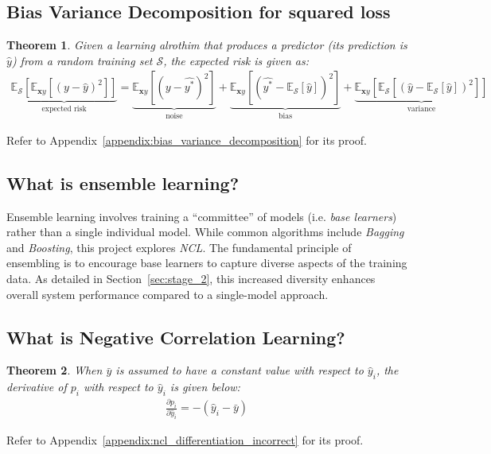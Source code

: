 \documentclass{article}
\newtheorem{theorem}{Theorem}
\begin{document}
\subsection{Bias Variance Decomposition for squared loss}
\begin{theorem}\label{theorem:bias_variance_decomposition}
    Given a learning alrothim that produces a predictor (its prediction is $\hat{y}$) from a random training set $\mathcal{S}$, the expected risk is given as: 
    \begin{align*}
        \underbrace{\mathbb{E}_{\mathcal{S}}\left[\mathbb{E}_{\mathbf{x}y}\left[(y - \hat{y})^2\right]\right]}_{\text{expected risk}} = \underbrace{\mathbb{E}_{\mathbf{x}y}\left[(y - \hat{y^*})^2\right]}_{\text{noise}} + \underbrace{\mathbb{E}_{\mathbf{x}y}\left[\left(\hat{y^*} - \mathbb{E}_{\mathcal{S}}[\hat{y}]\right)^2\right]}_{\text{bias}} + \underbrace{\mathbb{E}_{\mathbf{x}y}\left[\mathbb{E}_{\mathcal{S}}\left[(\hat{y} - \mathbb{E}_{\mathcal{S}}[\hat{y}])^2\right]\right]}_{\text{variance}}
    \end{align*}
\end{theorem}
Refer to Appendix~\ref{appendix:bias_variance_decomposition} for its proof. 


\subsection{What is ensemble learning? }
Ensemble learning involves training a ``committee'' of models (i.e. \textit{base learners}) rather than a single individual model. While common algorithms include \textit{Bagging} and \textit{Boosting}, this project explores \textit{NCL}. The fundamental principle of ensembling is to encourage base learners to capture diverse aspects of the training data. As detailed in Section~\ref{sec:stage_2}, this increased diversity enhances overall system performance compared to a single-model approach. 


\subsection{What is Negative Correlation Learning? }
\label{subsec:background_ncl}
\begin{theorem}\label{theorem:ncl_differentiation_incorrect}
    When $\bar{y}$ is assumed to have a constant value with respect to $\hat{y}_i$, the derivative of $p_i$ with respect to $\hat{y}_i$ is given below: 
    \begin{align*}
        \frac{\partial{p_i}}{\partial{\hat{y}_i}} = -(\hat{y}_i - \bar{y})
    \end{align*}
\end{theorem}
Refer to Appendix~\ref{appendix:ncl_differentiation_incorrect} for its proof. 
\end{document}
